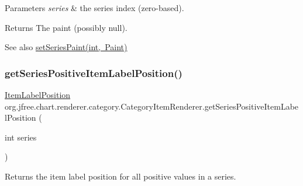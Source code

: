 \begin{DoxyParams}{Parameters}
{\em series} & the series index (zero-\/based).\\
\hline
\end{DoxyParams}
\begin{DoxyReturn}{Returns}
The paint (possibly {\ttfamily null}).
\end{DoxyReturn}
\begin{DoxySeeAlso}{See also}
\mbox{\hyperlink{interfaceorg_1_1jfree_1_1chart_1_1renderer_1_1category_1_1_category_item_renderer_a5e1be0451c25f554cca76cceaa5a3785}{set\+Series\+Paint(int, Paint)}} 
\end{DoxySeeAlso}
\mbox{\label{interfaceorg_1_1jfree_1_1chart_1_1renderer_1_1category_1_1_category_item_renderer_aa8bb0c1b20139707cb336afc9bed9b78}} 
\subsubsection{\texorpdfstring{get\+Series\+Positive\+Item\+Label\+Position()}{getSeriesPositiveItemLabelPosition()}}
{\footnotesize\ttfamily \mbox{\hyperlink{classorg_1_1jfree_1_1chart_1_1labels_1_1_item_label_position}{Item\+Label\+Position}} org.\+jfree.\+chart.\+renderer.\+category.\+Category\+Item\+Renderer.\+get\+Series\+Positive\+Item\+Label\+Position (\begin{DoxyParamCaption}\item[{int}]{series }\end{DoxyParamCaption})}

Returns the item label position for all positive values in a series.


